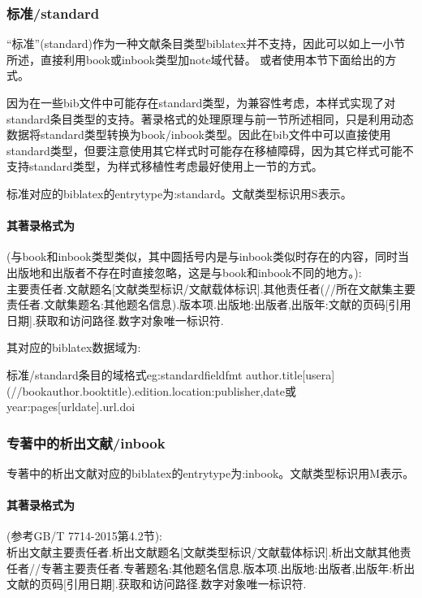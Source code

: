 \subsubsection{标准/standard}\label{sec:standard}
“标准”(standard)作为一种文献条目类型biblatex并不支持，因此可以如上一小节所述，直接利用book或inbook类型加note域代替。
或者使用本节下面给出的方式。

因为在一些bib文件中可能存在standard类型，为兼容性考虑，本样式实现了对standard条目类型的支持。著录格式的处理原理与前一节所述相同，只是利用动态数据将standard类型转换为book/inbook类型。因此在bib文件中可以直接使用standard类型，但要注意使用其它样式时可能存在移植障碍，因为其它样式可能不支持standard类型，为样式移植性考虑最好使用上一节的方式。

\begin{refentry}{}{}
标准对应的biblatex的entrytype为:standard。文献类型标识用S表示。

\paragraph{其著录格式为}(与book和inbook类型类似，其中圆括号内是与inbook类似时存在的内容，同时当出版地和出版者不存在时直接忽略，这是与book和inbook不同的地方。):\\
主要责任者.文献题名[文献类型标识/文献载体标识].其他责任者(//所在文献集主要责任者.文献集题名:其他题名信息).版本项.出版地:出版者,出版年:文献的页码[引用日期].获取和访问路径.数字对象唯一标识符.
\end{refentry}

其对应的biblatex数据域为:
\begin{codetex}{标准/standard条目的域格式}{eg:standardfieldfmt}
author.title[usera](//bookauthor.booktitle).edition.location:publisher,date或year:pages[urldate].url.doi
\end{codetex}


\subsubsection{专著中的析出文献/inbook}
\begin{refentry}{}{}
专著中的析出文献对应的biblatex的entrytype为:inbook。文献类型标识用M表示。

\paragraph{其著录格式为}(参考GB/T 7714-2015第4.2节):\\
析出文献主要责任者.析出文献题名[文献类型标识/文献载体标识].析出文献其他责任者//专著主要责任者.专著题名:其他题名信息.版本项.出版地:出版者,出版年:析出文献的页码[引用日期].获取和访问路径.数字对象唯一标识符.
\end{refentry}

